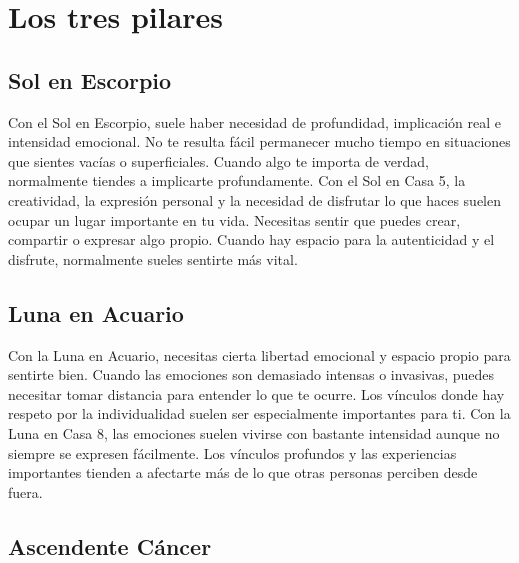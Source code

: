 \documentclass[11pt,a4paper]{article}
\begin{document}
\vspace{0.8cm}


\section{Los tres pilares}

\subsection{Sol en Escorpio}

Con el Sol en Escorpio, suele haber necesidad de profundidad, implicación real e intensidad emocional. No te resulta fácil permanecer mucho tiempo en situaciones que sientes vacías o superficiales. Cuando algo te importa de verdad, normalmente tiendes a implicarte profundamente. Con el Sol en Casa 5, la creatividad, la expresión personal y la necesidad de disfrutar lo que haces suelen ocupar un lugar importante en tu vida. Necesitas sentir que puedes crear, compartir o expresar algo propio. Cuando hay espacio para la autenticidad y el disfrute, normalmente sueles sentirte más vital.

\vspace{0.8cm}

\subsection{Luna en Acuario}

Con la Luna en Acuario, necesitas cierta libertad emocional y espacio propio para sentirte bien. Cuando las emociones son demasiado intensas o invasivas, puedes necesitar tomar distancia para entender lo que te ocurre. Los vínculos donde hay respeto por la individualidad suelen ser especialmente importantes para ti. Con la Luna en Casa 8, las emociones suelen vivirse con bastante intensidad aunque no siempre se expresen fácilmente. Los vínculos profundos y las experiencias importantes tienden a afectarte más de lo que otras personas perciben desde fuera.

\vspace{0.8cm}

\subsection{Ascendente Cáncer}
\end{document}
